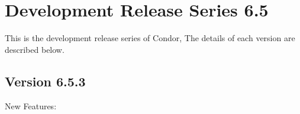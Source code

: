 \section{\label{sec:History-6-5}Development Release Series 6.5}

This is the development release series of Condor,
The details of each version are described below.

\subsection{\label{sec:New-6-5-3}Version 6.5.3}

\noindent New Features:

